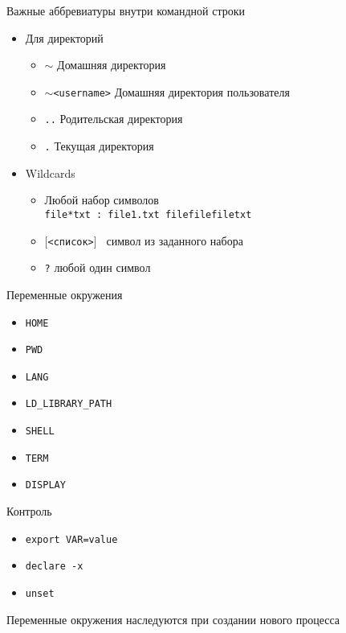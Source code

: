 \begin{frame}{Важные аббревиатуры внутри командной строки}
  \begin{itemize}
    \item Для директорий
      \begin{itemize}
        \item {\tt $\sim$} Домашняя директория
        \item {\tt $\sim$<username>} Домашняя директория пользователя
        \item {\tt ..} Родительская директория
        \item {\tt .} Текущая директория
      \end{itemize}
      \pause
    \item Wildcards
      \begin{itemize}
        \item {\tt *} Любой набор символов \\
         {\tt file*txt : file1.txt filefilefiletxt}
        \item {\tt $[$<список>$]$ } символ из заданного набора
        \item {\tt ?} любой один символ
      \end{itemize}

  \end{itemize}
\end{frame}


\begin{frame}{Переменные окружения}
  \begin{itemize}
    \item {\tt HOME}
    \item {\tt PWD}
    \item {\tt LANG}
    \item {\tt LD\_LIBRARY\_PATH}
    \item {\tt SHELL}
    \item {\tt TERM}
    \item {\tt DISPLAY}
  \end{itemize}

  Контроль

  \begin{itemize}
    \item {\tt export VAR=value}
    \item {\tt declare -x}
    \item {\tt unset}
  \end{itemize}

  Переменные окружения наследуются при создании нового процесса
\end{frame}



